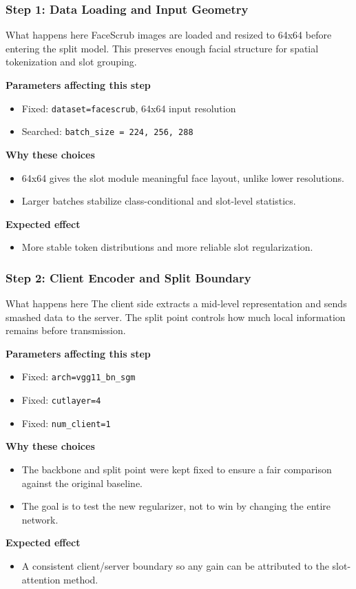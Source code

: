 \documentclass[aspectratio=169]{beamer}
\newcommand{\stepheader}[2]{
    \frametitle{Step #1: #2}
}
\begin{document}
\begin{frame}
    \stepheader{1}{Data Loading and Input Geometry}
    \small
    \begin{block}{What happens here}
        FaceScrub images are loaded and resized to 64x64 before entering the split model. This preserves enough facial structure for spatial tokenization and slot grouping.
    \end{block}
    \textbf{Parameters affecting this step}
    \begin{itemize}
        \item Fixed: \texttt{dataset=facescrub}, 64x64 input resolution
        \item Searched: \texttt{batch\_size = 224, 256, 288}
    \end{itemize}
    \textbf{Why these choices}
    \begin{itemize}
        \item 64x64 gives the slot module meaningful face layout, unlike lower resolutions.
        \item Larger batches stabilize class-conditional and slot-level statistics.
    \end{itemize}
    \textbf{Expected effect}
    \begin{itemize}
        \item More stable token distributions and more reliable slot regularization.
    \end{itemize}
\end{frame}

\begin{frame}
    \stepheader{2}{Client Encoder and Split Boundary}
    \small
    \begin{block}{What happens here}
        The client side extracts a mid-level representation and sends smashed data to the server. The split point controls how much local information remains before transmission.
    \end{block}
    \textbf{Parameters affecting this step}
    \begin{itemize}
        \item Fixed: \texttt{arch=vgg11\_bn\_sgm}
        \item Fixed: \texttt{cutlayer=4}
        \item Fixed: \texttt{num\_client=1}
    \end{itemize}
    \textbf{Why these choices}
    \begin{itemize}
        \item The backbone and split point were kept fixed to ensure a fair comparison against the original baseline.
        \item The goal is to test the new regularizer, not to win by changing the entire network.
    \end{itemize}
    \textbf{Expected effect}
    \begin{itemize}
        \item A consistent client/server boundary so any gain can be attributed to the slot-attention method.
    \end{itemize}
\end{frame}
\end{document}
